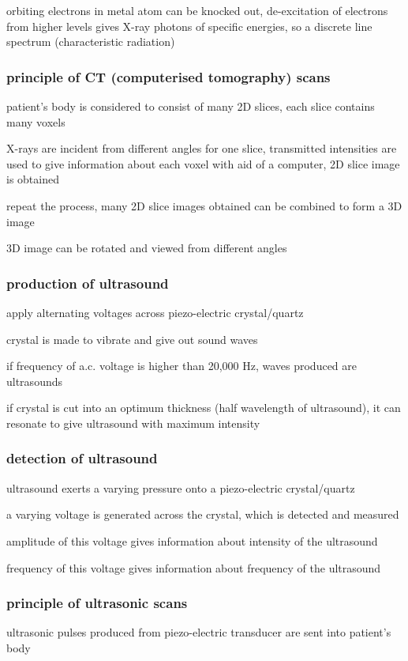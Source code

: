 {orbiting electrons in metal atom can be knocked out, de-excitation of electrons from higher levels gives X-ray photons of specific energies, so a discrete line spectrum (characteristic radiation)


\subsubsection*{principle of CT (computerised tomography) scans}
patient’s body is considered to consist of many  2D slices, each slice contains many voxels

X-rays are incident from different angles for one slice, transmitted intensities are used to give information about each voxel with aid of a computer, 2D slice image is obtained

repeat the process, many 2D slice images obtained can be combined to form a 3D image

3D image can be rotated and viewed from different angles


\subsubsection*{production of ultrasound}

apply alternating voltages across piezo-electric crystal/quartz

crystal is made to vibrate and give out sound waves

if frequency of a.c. voltage is higher than 20,000 Hz, waves produced are ultrasounds

if crystal is cut into an optimum thickness (half wavelength of ultrasound), it can resonate to give ultrasound with maximum intensity

\subsubsection*{detection of ultrasound}

ultrasound exerts a varying pressure onto a piezo-electric crystal/quartz

a varying voltage is generated across the crystal, which is detected and measured

amplitude of this voltage gives information about intensity of the ultrasound

frequency of this voltage gives information about frequency of the ultrasound


\subsubsection*{principle of ultrasonic scans}
ultrasonic pulses produced from piezo-electric transducer are sent into patient’s body

}
